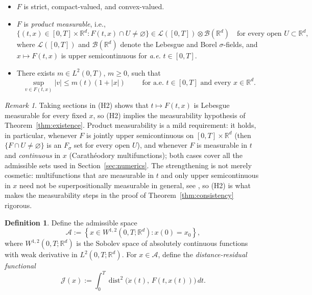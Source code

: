 \documentclass[11pt]{elsarticle}
\theoremstyle{definition}
\newtheorem{definition}[theorem]{Definition}
\theoremstyle{remark}
\newtheorem{remark}[theorem]{Remark}
\numberwithin{equation}{section}
\def\dist{\operatorname{dist}}
\begin{document}
	\begin{itemize}
		\item[(H1)] $F$ is strict, compact-valued, and convex-valued.
		\item[(H2)] $F$ is \emph{product measurable}, i.e.,
		\[
		\bigl\{(t,x)\in[0,T]\times\mathbb{R}^d:F(t,x)\cap
		U\neq\varnothing\bigr\}
		\in
		\mathcal{L}([0,T])\otimes\mathcal{B}(\mathbb{R}^d)
		\quad\text{for every open }U\subset\mathbb{R}^d,
		\]
		where $\mathcal{L}([0,T])$ and $\mathcal{B}(\mathbb{R}^d)$ denote the
		Lebesgue and Borel $\sigma$-fields, and $x\mapsto F(t,x)$ is upper
		semicontinuous for \emph{a.e.} $t\in[0,T]$.
		\item[(H3)] There exists $m\in L^2(0,T)$, $m\ge0$, such that
		\[
		\sup_{v\in F(t,x)}|v|\le m(t)(1+|x|) \qquad  
		\text{ for a.e. } t\in[0,T] \text{ and every } x\in\mathbb{R}^d.
		\]
	\end{itemize}
	
	\begin{remark}\label{rem:H2-product}
		Taking sections in \textup{(H2)} shows that $t\mapsto F(t,x)$ is
		Lebesgue measurable for every fixed $x$, so \textup{(H2)} implies the
		measurability hypothesis of Theorem~\ref{thm:existence}. Product
		measurability is a mild requirement: it holds, in particular,
		whenever $F$ is jointly upper semicontinuous on
		$[0,T]\times\mathbb{R}^d$ (then $\{F\cap U\neq\varnothing\}$ is an
		$F_\sigma$ set for every open $U$), and whenever $F$ is measurable in
		$t$ and \emph{continuous} in $x$ (Carath\'eodory multifunctions);
		both cases cover all the admissible sets used in
		Section~\ref{sec:numerics}. The strengthening is not merely
		cosmetic: multifunctions that are measurable in $t$ and only upper
		semicontinuous in $x$ need not be superpositionally measurable in
		general, see \cite{zygmunt_1992}, so \textup{(H2)} is what makes the
		measurability steps in the proof of
		Theorem~\ref{thm:consistency} rigorous.
	\end{remark}
	
	\begin{definition}\label{def:admissible-class}
		Define the admissible space
		\[
		\mathcal{A}:= \left\{ x \in W^{1,2}(0,T; \mathbb{R}^d) : x(0) = x_0 \right\},
		\]
		where $W^{1,2}(0,T; \mathbb{R}^d)$ is the Sobolev space of absolutely 
		continuous functions with weak derivative in $L^2(0,T; \mathbb{R}^d)$.
		For $x\in\mathcal{A}$, define the \emph{distance-residual functional}
		\begin{equation}\label{eq:cont-functional}
			\mathcal{J}(x)
			:=
			\int_0^T\dist^2\bigl(\dot{x}(t),\,F(t,x(t))\bigr)\,dt.
		\end{equation}
	\end{definition}
	
\end{document}
